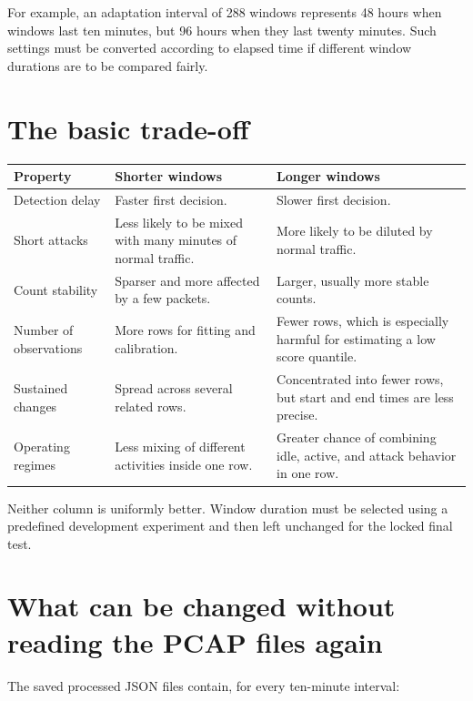 \documentclass[11pt,a4paper]{article}
\begin{document}
For example, an adaptation interval of 288 windows represents 48 hours when
windows last ten minutes, but 96 hours when they last twenty minutes.  Such
settings must be converted according to elapsed time if different window
durations are to be compared fairly.

\section{The basic trade-off}

\begin{table}[htbp]
\centering
\small
\begin{tabular}{p{}p{}p{}}
\toprule
Property & Shorter windows & Longer windows \\
\midrule
Detection delay
& Faster first decision.
& Slower first decision. \\
\addlinespace
Short attacks
& Less likely to be mixed with many minutes of normal traffic.
& More likely to be diluted by normal traffic. \\
\addlinespace
Count stability
& Sparser and more affected by a few packets.
& Larger, usually more stable counts. \\
\addlinespace
Number of observations
& More rows for fitting and calibration.
& Fewer rows, which is especially harmful for estimating a low score quantile.
  \\
\addlinespace
Sustained changes
& Spread across several related rows.
& Concentrated into fewer rows, but start and end times are less precise. \\
\addlinespace
Operating regimes
& Less mixing of different activities inside one row.
& Greater chance of combining idle, active, and attack behavior in one row. \\
\bottomrule
\end{tabular}
\end{table}

Neither column is uniformly better.  Window duration must be selected using a
predefined development experiment and then left unchanged for the locked final
test.

\section{What can be changed without reading the PCAP files again}

The saved processed JSON files contain, for every ten-minute interval:
\end{document}
